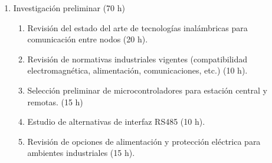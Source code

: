 \documentclass[
11pt, %
]{charter}
\begin{document}
\begin{enumerate}
	\item Investigación preliminar (70 h)
	\begin{enumerate}
		\item Revisión del estado del arte de tecnologías inalámbricas para comunicación entre nodos (20 h).
		\item Revisión de normativas industriales vigentes (compatibilidad electromagnética, alimentación, comunicaciones, etc.) (10 h).
		\item Selección preliminar de microcontroladores para estación central y remotas. (15 h)
		\item Estudio de alternativas de interfaz RS485 (10 h).
		\item Revisión de opciones de alimentación y protección eléctrica para ambientes industriales (15 h).
	\end{enumerate}
	

\end{enumerate}
\end{document}
